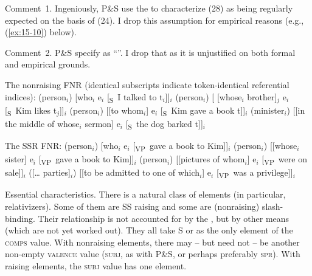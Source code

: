 \documentclass[output=paper]{LSP/langsci}
\begin{document}
\randnum\label{rn:15-5} Comment~1. Ingeniously, P\&S use the  to characterize (28) as being regularly expected on the basis of (24). I drop this assumption for empirical reasons (e.g., (\ref{ex:15-10}) below).

Comment~2. P\&S specify  as ``''. I drop that as it is unjustified on both formal and empirical grounds.
\vspace{1em}

\randnum\label{rn:15-6}The nonraising FNR (identical subscripts indicate token-identical referential indices):
\eal%
\settowidth{}
\label{ex:15-1}
\ex%
\label{ex:15-1a}
(person$_{i}$) [who$_{i}$ e$_{i}$ [\textsubscript{S}~I talked to t$_{i}$]]$_{i}$ 
\ex%
\label{ex:15-1b}
(person$_{i}$) [ [whose$_{i}$ brother]$_{j}$ e$_{i}$ [\textsubscript{S}~Kim likes t$_j$]]$_{i}$ 
\ex%
\label{ex:15-1c}
(person$_{i}$) [[to whom$_{i}$] e$_{i}$ [\textsubscript{S}~Kim gave a book t]]$_{i}$ 
\ex%
\label{ex:15-1d}
(minister$_{i}$) [[in the middle of whose$_{i}$ sermon] e$_{i}$ [\textsubscript{S}~the dog barked
    t]]$_{i}$ 
\zl

\pagebreak
{\randnum}The SSR FNR:
\eal%
\settowidth{}
\label{ex:15-2}
\ex%
\label{ex:15-2a}
(person$_{i}$) [who$_{i}$ e$_{i}$ [\textsubscript{VP}~gave a book to Kim]]$_{i}$ 
\ex%
\label{ex:15-2b}
(person$_{i}$) [[whose$_{i}$ sister] e$_{i}$ [\textsubscript{VP}~gave a book to Kim]]$_{i}$ 
\ex%
\label{ex:15-2c}
(person$_{i}$) [[pictures of whom$_{i}$] e$_{i}$ [\textsubscript{VP}~were on sale]]$_{i}$ 
\ex%
\label{ex:15-2d}
([\ldots{} parties]$_{i}$) [[to be admitted to one of which$_{i}$] e$_{i}$ [\textsubscript{VP}~was a privilege]]$_{i}$ 
\zl

\noindent
\randnum\label{rn:15-7-2}Essential characteristics.%
\label{rn:15-7} There is a natural class of  elements (in particular, relativizers). Some of them
are SS raising and some are (nonraising) slash-binding. Their
relationship is not accounted for by the , but by other means
(which are not yet worked out). They all take S or  as the only
element of the \textsc{comps} value. With nonraising elements, there may -- but need not -- be another non-empty \textsc{valence} value (\textsc{subj}, as with P\&S, or perhaps preferably \textsc{spr}). With raising elements, the \textsc{subj} value has one element.
\end{document}
